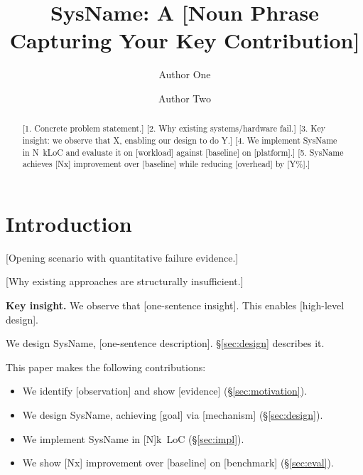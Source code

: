 \documentclass[sigplan,nonacm]{acmart}
\newcommand{\sysname}{SysName\xspace}   %
\begin{document}
\title{\sysname: A [Noun Phrase Capturing Your Key Contribution]}

\author{Author One}
\author{Author Two}

\begin{abstract}

[1. Concrete problem statement.] [2. Why existing systems/hardware fail.]
[3. Key insight: we observe that X, enabling our design to do Y.] [4. We
implement \sysname in N~kLoC and evaluate it on [workload] against [baseline]
on [platform].] [5. \sysname achieves [Nx] improvement over [baseline] while
reducing [overhead] by [Y\%].]
\end{abstract}

\maketitle   %

\section{Introduction}

[Opening scenario with quantitative failure evidence.]

[Why existing approaches are structurally insufficient.]

\textbf{Key insight.}
We observe that [one-sentence insight]. This enables [high-level design].

We design \sysname, [one-sentence description]. \S\ref{sec:design} describes it.

This paper makes the following contributions:
\begin{itemize}
  \item We identify [observation] and show [evidence] (\S\ref{sec:motivation}).
  \item We design \sysname, achieving [goal] via [mechanism] (\S\ref{sec:design}).
  \item We implement \sysname in [N]k~LoC (\S\ref{sec:impl}).
  \item We show [Nx] improvement over [baseline] on [benchmark] (\S\ref{sec:eval}).
\end{itemize}
\end{document}
